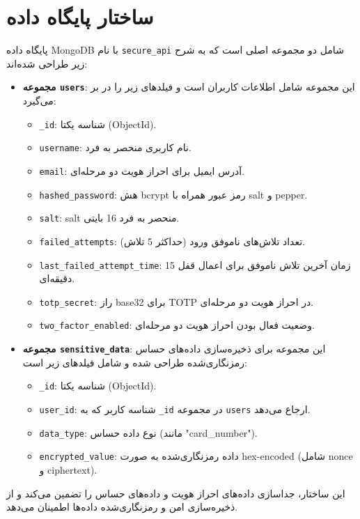 \documentclass[a4paper,12pt]{article}
\begin{document}
\section{ساختار پایگاه داده}
پایگاه داده MongoDB با نام \texttt{secure\_api} شامل دو مجموعه اصلی است که به شرح زیر طراحی شده‌اند:
\begin{itemize}
    \item \textbf{مجموعه \texttt{users}}: این مجموعه شامل اطلاعات کاربران است و فیلدهای زیر را در بر می‌گیرد:
    \begin{itemize}
        \item \texttt{\_id}: شناسه یکتا (ObjectId).
        \item \texttt{username}: نام کاربری منحصر به فرد.
        \item \texttt{email}: آدرس ایمیل برای احراز هویت دو مرحله‌ای.
        \item \texttt{hashed\_password}: هش bcrypt رمز عبور همراه با salt و pepper.
        \item \texttt{salt}: salt منحصر به فرد 16 بایتی.
        \item \texttt{failed\_attempts}: تعداد تلاش‌های ناموفق ورود (حداکثر 5 تلاش).
        \item \texttt{last\_failed\_attempt\_time}: زمان آخرین تلاش ناموفق برای اعمال قفل 15 دقیقه‌ای.
        \item \texttt{totp\_secret}: راز base32 برای TOTP در احراز هویت دو مرحله‌ای.
        \item \texttt{two\_factor\_enabled}: وضعیت فعال بودن احراز هویت دو مرحله‌ای.
    \end{itemize}
    \item \textbf{مجموعه \texttt{sensitive\_data}}: این مجموعه برای ذخیره‌سازی داده‌های حساس رمزنگاری‌شده طراحی شده و شامل فیلدهای زیر است:
    \begin{itemize}
        \item \texttt{\_id}: شناسه یکتا (ObjectId).
        \item \texttt{user\_id}: شناسه کاربر که به \texttt{\_id} در مجموعه \texttt{users} ارجاع می‌دهد.
        \item \texttt{data\_type}: نوع داده حساس (مانند "card\_number").
        \item \texttt{encrypted\_value}: داده رمزنگاری‌شده به صورت hex-encoded (شامل nonce و ciphertext).
    \end{itemize}
\end{itemize}
این ساختار، جداسازی داده‌های احراز هویت و داده‌های حساس را تضمین می‌کند و از ذخیره‌سازی امن و رمزنگاری‌شده داده‌ها اطمینان می‌دهد.
\end{document}
